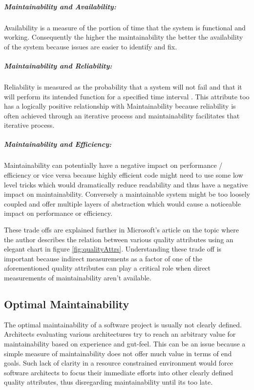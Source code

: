 \documentclass[15pt]{article}
\begin{document}
\subparagraph{Maintainability and Availability:} Availability is a measure of the portion of time that the system is functional and working\cite{microsoft_quality_2016}. Consequently the higher the maintainability the better the availability of the system because issues are easier to identify and fix.

\subparagraph{Maintainability and Reliability: } Reliability is measured as the probability that a system will not fail and that it will perform its intended function for a specified time interval \cite{microsoft_quality_2016}. This attribute too has a logically positive relationship with Maintainability because reliability is often achieved through an iterative process and maintainability facilitates that iterative process.

\subparagraph{Maintainability and Efficiency: } Maintainability can potentially have a negative impact on performance / efficiency or vice versa because highly efficient code might need to use some low level tricks which would dramatically reduce readability and thus have a negative impact on maintainability. Conversely a maintainable system might be too loosely coupled and offer multiple layers of abstraction which would cause a noticeable impact on performance or efficiency.

These trade offs are explained further in Microsoft's article on the topic \cite{morgan_implementing_2007} where the author describes the relation between various quality attributes using an elegant chart in figure  \ref{fig:qualityAttrs}. Understanding these trade off is important because indirect measurements as a factor of one of the aforementioned quality attributes can play a critical role when direct measurements of maintainability aren't available.

\subsection{Optimal Maintainability}

The optimal maintainability of a software project is usually not clearly defined. Architects evaluating various architectures try to reach an arbitrary value for maintainability based on experience and gut-feel. This can be an issue because a simple measure of maintainability does not offer much value in terms of end goals. Such lack of clarity in a resource constrained environment would force software architects to focus their immediate efforts into other clearly defined quality attributes, thus disregarding maintainability until its too late.
\end{document}
